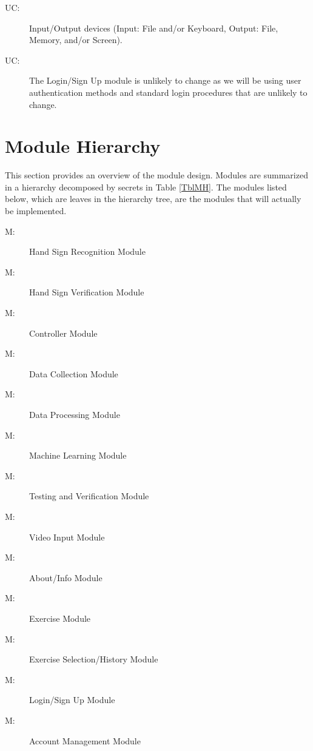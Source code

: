 \documentclass[12pt, titlepage]{article}
\newcounter{ucnum}
\newcommand{\uctheucnum}{UC\theucnum}
\newcounter{mnum}
\newcommand{\mthemnum}{M\themnum}
\begin{document}
\begin{description}
\item[ \uctheucnum \label{ucIO}:] Input/Output devices
  (Input: File and/or Keyboard, Output: File, Memory, and/or Screen).
\item[ \uctheucnum \label{ucLogin}:] The Login/Sign Up module is unlikely to change as we will be using user authentication methods and standard login procedures that are unlikely to change.
\end{description}

\section{Module Hierarchy} \label{SecMH}

This section provides an overview of the module design. Modules are summarized
in a hierarchy decomposed by secrets in Table \ref{TblMH}. The modules listed
below, which are leaves in the hierarchy tree, are the modules that will
actually be implemented.

\begin{description}
\item [ \mthemnum \label{m1}:] Hand Sign Recognition Module
\item [ \mthemnum \label{m2}:] Hand Sign Verification Module
\item [ \mthemnum \label{m3}:] Controller Module
\item [ \mthemnum \label{m4}:] Data Collection Module
\item [ \mthemnum \label{m5}:] Data Processing Module
\item [ \mthemnum \label{m6}:] Machine Learning Module
\item [ \mthemnum \label{m7}:] Testing and Verification Module
\item [ \mthemnum \label{m8}:] Video Input Module
\item [ \mthemnum \label{m9}:] About/Info Module
\item [ \mthemnum \label{m10}:] Exercise Module
\item [ \mthemnum \label{m11}:] Exercise Selection/History Module
\item [ \mthemnum \label{m12}:] Login/Sign Up Module
\item [ \mthemnum \label{m13}:] Account Management Module
\end{description}
\end{document}

